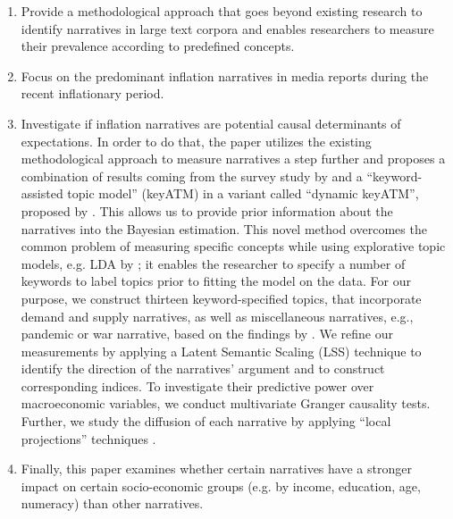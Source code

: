 \begin{enumerate}
	\item Provide a methodological approach that goes beyond existing research to identify narratives in large text corpora and enables researchers to measure their prevalence according to predefined concepts.
	\item Focus on the predominant inflation narratives in media reports during the recent inflationary period. 
	\item  Investigate if inflation narratives are potential causal determinants of expectations. In order to do that, the paper utilizes the existing methodological approach to measure narratives a step further and proposes a combination of results coming from the survey study by \cite{Andre.2023} and a ``keyword-assisted topic model'' (\textsf{keyATM}) in a variant called ``dynamic \textsf{keyATM}'', proposed by \cite{Eshima.2023}. This allows us to provide prior information about the narratives into the Bayesian estimation. This novel method overcomes the common problem of measuring specific concepts while using explorative topic models, e.g. LDA by \cite{blei.2003}; it enables the researcher to specify a number of keywords to label topics prior to fitting the model on the data. For our purpose, we construct thirteen keyword-specified topics, that incorporate demand and supply narratives, as well as miscellaneous narratives, e.g., pandemic or war narrative, based on the findings by \cite{Andre.2023}. We refine our measurements by applying a Latent Semantic Scaling (\textsf{LSS}) technique \citep{Watanabe.2021} to identify the direction of the narratives' argument and to construct corresponding indices. To investigate their predictive power over macroeconomic variables, we conduct multivariate Granger causality tests. Further, we study the diffusion of each narrative by applying ``local projections'' techniques \citep{Jorda.2005}. 
	\item Finally, this paper examines whether certain narratives have a stronger impact on certain socio-economic groups (e.g. by income, education, age, numeracy) than other narratives. 
\end{enumerate}


